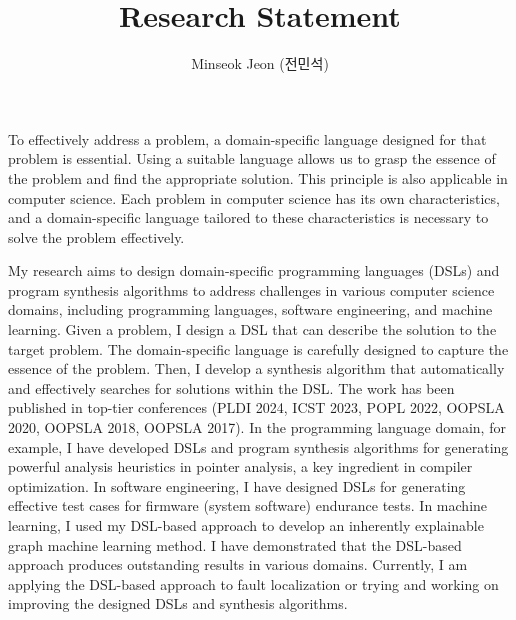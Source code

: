 \documentclass[11pt]{article}
\begin{document}
\title{Research Statement}

\author{Minseok Jeon (전민석)}



\newcommand{\DisjunctiveModel}{\textsc{Disjunctive Model}}
\newcommand{\FeatureLanguage}{\textsc{Feature Language}}
\newcommand{\GDL}{\textsc{Graph Description Language}}
\newcommand{\PLXGL}{\textsc{PL4XGL}}


\newcommand{\AbstractRelativeWritePattern}{\textsc{Abstract Relative Write Pattern}}

\maketitle 


To effectively address a problem, a domain-specific language designed for that problem is essential. 
%
Using a suitable language allows us to grasp the essence of the problem and find the appropriate solution. 
%
This principle is also applicable in computer science.
%
Each problem in computer science has its own characteristics, and a domain-specific language tailored to these characteristics is necessary to solve the problem effectively.




My research aims to design domain-specific programming languages (DSLs) and program synthesis algorithms to address challenges in various computer science domains, including programming languages, software engineering, and machine learning.
%
Given a problem, I design a DSL that can describe the solution to the target problem.
%
The domain-specific language is carefully designed to capture the essence of the problem.
%
Then, I develop a synthesis algorithm that automatically and effectively searches for solutions within the DSL.
%
The work has been published in top-tier conferences (PLDI 2024, ICST 2023, POPL 2022, OOPSLA 2020, OOPSLA 2018, OOPSLA 2017).
%
In the programming language domain, for example, I have developed DSLs and program synthesis algorithms for generating powerful analysis heuristics in pointer analysis, a key ingredient in compiler optimization.
%
In software engineering, I have designed DSLs for generating effective test cases for firmware (system software) endurance tests. 
%
In machine learning, I used my DSL-based approach to develop an inherently explainable graph machine learning method.
%
I have demonstrated that the DSL-based approach produces outstanding results in various domains.
%
Currently, I am applying the DSL-based approach to fault localization or trying and working on improving the designed DSLs and synthesis algorithms.
\end{document}
